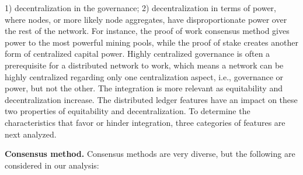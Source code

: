 1) decentralization in the governance; 2) decentralization in terms of power, where nodes, or more likely node aggregates, have disproportionate power over the rest of the network. For instance, the proof of work consensus method gives power to the most powerful mining pools, while the proof of stake creates another form of centralized capital power. Highly centralized governance is often a prerequisite for a distributed network to work, which means a network can be highly centralized regarding only one centralization aspect, i.e., governance or power, but not the other. 
The integration is more relevant as equitability and decentralization increase.
The distributed ledger features have an impact on these two properties of equitability and decentralization. To determine the characteristics that favor or hinder integration, three categories of features are next analyzed. 

\textbf{Consensus method.}
Consensus methods are very diverse, but the following are considered in our analysis:

